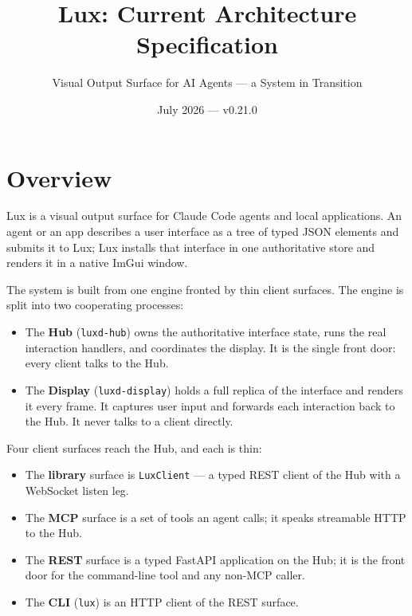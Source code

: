 \documentclass[a4paper,10pt]{article}
\newcommand{\tool}[1]{\texttt{#1}}
\begin{document}
\title{Lux: Current Architecture Specification}
\author{Visual Output Surface for AI Agents --- a System in Transition}
\date{July 2026 --- v0.21.0}
\maketitle

\tableofcontents
\newpage

\section{Overview}

Lux is a visual output surface for Claude Code agents and local
applications.  An agent or an app describes a user interface as a tree of
typed JSON elements and submits it to Lux; Lux installs that interface in
one authoritative store and renders it in a native ImGui window.

The system is built from one engine fronted by thin client surfaces.  The
engine is split into two cooperating processes:

\begin{itemize}
  \item The \textbf{Hub} (\tool{luxd-hub}) owns the authoritative interface
    state, runs the real interaction handlers, and coordinates the display.
    It is the single front door: every client talks to the Hub.
  \item The \textbf{Display} (\tool{luxd-display}) holds a full replica of
    the interface and renders it every frame.  It captures user input and
    forwards each interaction back to the Hub.  It never talks to a client
    directly.
\end{itemize}

Four client surfaces reach the Hub, and each is thin:

\begin{itemize}
  \item The \textbf{library} surface is \texttt{LuxClient} ---
    a typed REST client of the Hub with a WebSocket listen leg.
  \item The \textbf{MCP} surface is a set of tools an agent calls; it
    speaks streamable HTTP to the Hub.
  \item The \textbf{REST} surface is a typed FastAPI application on the
    Hub; it is the front door for the command-line tool and any non-MCP
    caller.
  \item The \textbf{CLI} (\tool{lux}) is an HTTP client of the REST
    surface.
\end{itemize}
\end{document}
